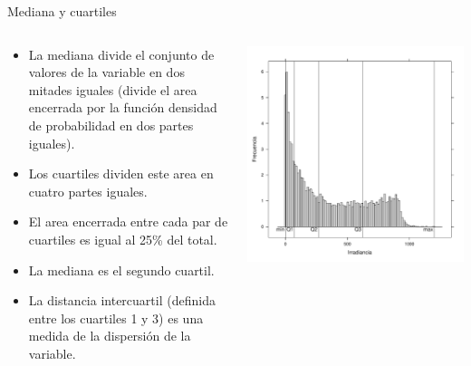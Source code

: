 \documentclass[aspectratio=169, usenames,svgnames,dvipsnames]{beamer}
\begin{document}
\begin{frame}[label={sec:org0998b66}]{Mediana y cuartiles}
\begin{columns}
\begin{column}{0.5\columnwidth}
\begin{itemize}
\item La \alert{mediana} divide el conjunto de valores de la variable en \alert{dos
mitades} iguales (divide el area encerrada por la función densidad
de probabilidad en dos partes iguales).
\item Los \alert{cuartiles} dividen este area en \alert{cuatro} partes iguales.
\item El area encerrada entre cada par de cuartiles es igual al 25\% del total.
\item La \alert{mediana} es el \alert{segundo cuartil}.
\item La \alert{distancia intercuartil} (definida entre los cuartiles 1 y 3) es
una \alert{medida de la dispersión} de la variable.
\end{itemize}
\end{column}

\begin{column}{0.5\columnwidth}
\begin{center}
\includegraphics[height=0.9\textheight]{../figs/cuantiles.pdf}
\end{center}
\end{column}
\end{columns}
\end{frame}
\end{document}
